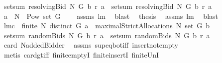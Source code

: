 \begin{isabellebody}
\ {\isachardoublequoteopen}setsum\ {\isacharparenleft}resolvingBid{\isacharprime}\ N\ G\ b\ r{\isacharparenright}\ a\ {\isacharequal}\ setsum\ {\isacharparenleft}resolvingBid\ N\ G\ b\ r{\isacharparenright}\ a{\isachardoublequoteclose}\isanewline
%
\isadelimproof
%
\endisadelimproof
%
\isatagproof
{}\isamarkupfalse%
\ {\isacharminus}\isanewline
{}\isamarkupfalse%
\ {\isachardoublequoteopen}a\ {\isasymsubseteq}\ N\ {\isasymtimes}\ {\isacharparenleft}Pow\ {\isacharparenleft}set\ G{\isacharparenright}\ {\isacharminus}\ {\isacharbraceleft}{\isacharbraceleft}{\isacharbraceright}{\isacharbraceright}{\isacharparenright}{\isachardoublequoteclose}\ \isamarkupfalse%
\ assms{\isacharparenleft}{}{\isacharparenright}\ lm{}{}\ \isamarkupfalse%
\ blast\ \isanewline
{}\isamarkupfalse%
\ {\isacharquery}thesis\ \isamarkupfalse%
\ assms{\isacharparenleft}{}{\isacharcomma}{}{\isacharparenright}\ lm{}{}\ \isamarkupfalse%
\ blast\isanewline
{}\isamarkupfalse%
%
\endisatagproof
{\isafoldproof}%
%
\isadelimproof
\isanewline
%
\endisadelimproof
\isanewline
{}\isamarkupfalse%
\ lm{}{}c{\isacharcolon}\ \ {\isachardoublequoteopen}finite\ N{\isachardoublequoteclose}\ {\isachardoublequoteopen}distinct\ G{\isachardoublequoteclose}\ {\isachardoublequoteopen}a\ {\isasymin}\ maximalStrictAllocations{\isacharprime}\ N\ {\isacharparenleft}set\ G{\isacharparenright}\ b{\isachardoublequoteclose}\ \isanewline
{}\ {\isachardoublequoteopen}setsum\ {\isacharparenleft}randomBids{\isacharprime}\ N\ G\ b\ r{\isacharparenright}\ a\ {\isacharequal}\ setsum\ {\isacharparenleft}randomBids\ N\ G\ b\ r{\isacharparenright}\ a{\isachardoublequoteclose}\isanewline
%
\isadelimproof
%
\endisadelimproof
%
\isatagproof
{}\isamarkupfalse%
\ {\isacharminus}\ \isanewline
{}\isamarkupfalse%
\ {\isachardoublequoteopen}card\ {\isacharparenleft}N{\isasymunion}{\isacharbraceleft}addedBidder{\isacharprime}{\isacharbraceright}{\isacharparenright}{\isachargreater}{}{\isachardoublequoteclose}\ \isamarkupfalse%
\ assms{\isacharparenleft}{}{\isacharparenright}\ sup{\isacharunderscore}eq{\isacharunderscore}bot{\isacharunderscore}iff\ insert{\isacharunderscore}not{\isacharunderscore}empty\isanewline
{}\isamarkupfalse%
\ {\isacharparenleft}metis\ card{\isacharunderscore}gt{\isacharunderscore}{}{\isacharunderscore}iff\ finite{\isachardot}emptyI\ finite{\isachardot}insertI\ finite{\isacharunderscore}UnI{\isacharparenright}\isanewline

\end{isabellebody}
